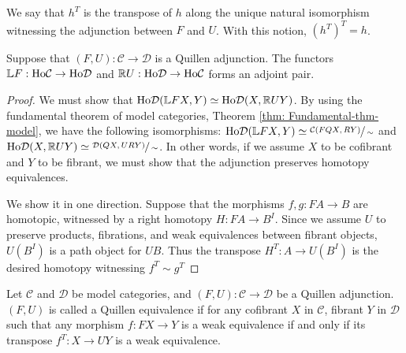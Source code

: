 \documentclass[../thesis.tex]{subfiles}
\begin{document}
            \begin{remark}
                We say that $h^T$ is the transpose of $h$ along the unique natural isomorphism witnessing the adjunction between $F$ and $U$. With this notion, $(h^T)^T = h$.
            \end{remark}

            \begin{proposition}
                Suppose that $(F,U):\mathcal{C}\rightarrow\mathcal{D}$ is a Quillen adjunction. The functors $\mathbb{L}F:\tt{Ho}\mathcal{C}\rightarrow \tt{Ho}\mathcal{D}$ and $\mathbb{R}U: \tt{Ho}\mathcal{D}\rightarrow \tt{Ho}\mathcal{C}$ forms an adjoint pair.
            \end{proposition}

            \begin{proof}
                We must show that $\tt{Ho}\mathcal{D}(\mathbb{L}FX, Y) \simeq \tt{Ho}\mathcal{D}(X, \mathbb{R}UY)$. By using the fundamental theorem of model categories, Theorem \ref{thm: Fundamental-thm-model}, we have the following isomorphisms: $\tt{Ho}\mathcal{D}(\mathbb{L}FX,Y)\simeq \sfrac{\mathcal{C}(FQX,RY)}{\sim}$ and $\tt{Ho}\mathcal{D}(X,\mathbb{R}UY)\simeq\sfrac{\mathcal{D}(QX,URY)}{\sim}$. In other words, if we assume $X$ to be cofibrant and $Y$ to be fibrant, we must show that the adjunction preserves homotopy equivalences.

                We show it in one direction. Suppose that the morphisms $f,g: FA\rightarrow B$ are homotopic, witnessed by a right homotopy $H: FA\rightarrow B^I$. Since we assume $U$ to preserve products, fibrations, and weak equivalences between fibrant objects, $U(B^I)$ is a path object for $UB$. Thus the transpose $H^T:A\rightarrow U(B^I)$ is the desired homotopy witnessing $f^T \sim g^T$
            \end{proof}

            \begin{definition}
                Let $\mathcal{C}$ and $\mathcal{D}$ be model categories, and $(F,U):\mathcal{C}\rightarrow\mathcal{D}$ be a Quillen adjunction. $(F,U)$ is called a Quillen equivalence if for any cofibrant $X$ in $\mathcal{C}$, fibrant $Y$ in $\mathcal{D}$ such that any morphism $f:FX\rightarrow Y$ is a weak equivalence if and only if its transpose $f^T:X\rightarrow UY$ is a weak equivalence.
            \end{definition}
\end{document}
